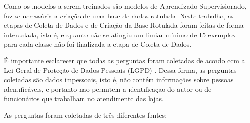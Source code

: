 Como os modelos a serem treinados são modelos de Aprendizado Supervisionado, faz-se necessária a criação de uma base de dados rotulada. Neste trabalho, as etapas de Coleta de Dados e de Criação da Base Rotulada foram feitas de forma intercalada, isto é, enquanto não se atingiu um limiar mínimo de 15 exemplos para cada classe não foi finalizada a etapa de Coleta de Dados.

É importante esclarecer que todas as perguntas foram coletadas de acordo com a Lei Geral de Proteção de Dados Pessoais (LGPD) \cite{lgpd}. Dessa forma, as perguntas coletadas são dados impessoais, isto é, não contém informações sobre pessoas identificáveis, e portanto não permitem a identificação do autor ou de funcionários que trabalham no atendimento das lojas.

As perguntas foram coletadas de três diferentes fontes:

